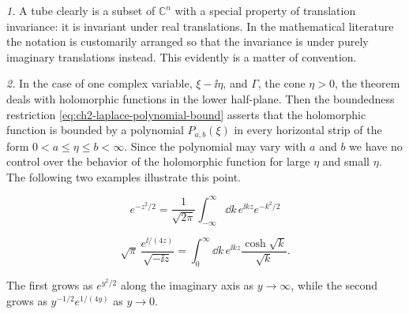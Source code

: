 \begin{remark*}
\textit{1.} A tube clearly is a subset of $\mathbb{C}^n$ with a special
property of translation invariance: it is invariant under real translations.
In the mathematical literature the notation is customarily arranged so that
the invariance is under purely imaginary translations instead.  This
evidently is a matter of convention.

\textit{2.} In the case of one complex variable, $\xi-\ii\eta$, and $\Gamma$,
the cone $\eta>0$, the theorem deals with holomorphic functions in the
lower half-plane.  Then the boundedness restriction \eqref{eq:ch2-laplace-polynomial-bound} asserts that the
holomorphic function is bounded by a polynomial $P_{a,b}(\xi)$ in every
horizontal strip of the form $0<a\leq\eta\leq b<\infty$.  Since the
polynomial may vary with $a$ and $b$ we have no control over the behavior of
the holomorphic function for large $\eta$ and small $\eta$.  The following
two examples illustrate this point.
\end{remark*}
\begin{equation}
  e^{-z^2/2}=\frac{1}{\sqrt{2\pi}}
  \int_{-\infty}^{\infty}\dd k\,e^{\ii kz}e^{-k^2/2}
  \tag{2-66}\label{eq:ch2-laplace-example-gaussian}
\end{equation}

\begin{equation}
  \sqrt{\pi}\,\frac{e^{\ii/(4z)}}{\sqrt{-\ii z}}
  =\int_0^\infty \dd k\,e^{\ii kz}\frac{\cosh\sqrt{k}}{\sqrt{k}} .
  \tag{2-67}\label{eq:ch2-laplace-example-cosh}
\end{equation}

The first grows as $e^{y^2/2}$ along the imaginary axis as $y\to\infty$,
while the second grows as $y^{-1/2}e^{1/(4y)}$ as $y\to0$.

